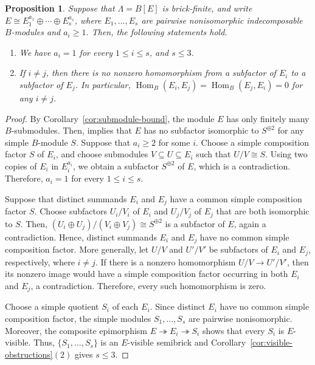 \documentclass[a4,12pt]{amsart}
\numberwithin{equation}{section} %
\def\Hom{\operatorname{Hom}} %
\newtheorem{proposition}[theorem]{Proposition} %
\theoremstyle{definition} %
\begin{document}
\begin{proposition}\label{prop:E-decomposition}
Suppose that $\Lambda=B[E]$ is brick-finite, and write $E\cong E_1^{a_1}\oplus\cdots\oplus E_s^{a_s}$, where $E_1,\ldots,E_s$ are pairwise nonisomorphic indecomposable $B$-modules and $a_i\geq1$. Then, the following statements hold.
\begin{enumerate}
\item We have $a_i=1$ for every $1\leq i\leq s$, and $s\leq3$.

\item If $i\neq j$, then there is no nonzero homomorphism from a subfactor of $E_i$ to a subfactor of $E_j$. In particular, $\Hom_B(E_i,E_j)=\Hom_B(E_j,E_i)=0$ for any $i\neq j$.
\end{enumerate}
\end{proposition}
\begin{proof}
By Corollary~\ref{cor:submodule-bound}, the module $E$ has only finitely many $B$-submodules. Then, \cite[Theorem~2.2]{Iovanov-Koffi-2022} implies that $E$ has no subfactor isomorphic to $S^{\oplus 2}$ for any simple $B$-module $S$. Suppose that $a_i\geq2$ for some $i$. Choose a simple composition factor $S$ of $E_i$, and choose submodules $V\subseteq U\subseteq E_i$ such that $U/V\cong S$. Using two copies of $E_i$ in $E_i^{a_i}$, we obtain a subfactor $S^{\oplus 2}$ of $E$, which is a contradiction. Therefore, $a_i=1$ for every $1\leq i\leq s$.

Suppose that distinct summands $E_i$ and $E_j$ have a common simple composition factor $S$. Choose subfactors $U_i/V_i$ of $E_i$ and $U_j/V_j$ of $E_j$ that are both isomorphic to $S$. Then, $(U_i\oplus U_j)/(V_i\oplus V_j)\cong S^{\oplus 2}$ is a subfactor of $E$, again a contradiction. Hence, distinct summands $E_i$ and $E_j$ have no common simple composition factor. More generally, let $U/V$ and $U'/V'$ be subfactors of $E_i$ and $E_j$, respectively, where $i\neq j$. If there is a nonzero homomorphism $U/V\longrightarrow U'/V'$, then its nonzero image would have a simple composition factor occurring in both $E_i$ and $E_j$, a contradiction. Therefore, every such homomorphism is zero. 

Choose a simple quotient $S_i$ of each $E_i$. Since distinct $E_i$ have no common simple composition factor, the simple modules $S_1,\ldots,S_s$ are pairwise nonisomorphic. Moreover, the composite epimorphism $E\twoheadrightarrow E_i\twoheadrightarrow S_i$ shows that every $S_i$ is $E$-visible. Thus, $\{S_1,\ldots,S_s\}$ is an $E$-visible semibrick and  Corollary~\ref{cor:visible-obstructions}$(2)$ gives $s\leq3$.
\end{proof}
\end{document}

